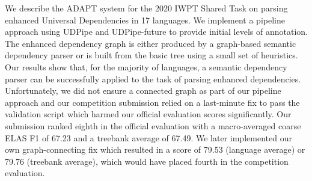 We describe the ADAPT system for the 2020 IWPT Shared Task on parsing enhanced Universal Dependencies in 17 languages. We implement a pipeline approach using UDPipe and UDPipe-future to provide initial levels of annotation. The enhanced dependency graph is either produced by a graph-based semantic dependency parser or is built from the basic tree using a small set of heuristics. Our results show that, for the majority of languages, a semantic dependency parser can be successfully applied to the task of parsing enhanced dependencies. Unfortunately, we did not ensure a connected graph as part of our pipeline approach and our competition submission relied on a last-minute fix to pass the validation script which harmed our official evaluation scores significantly. Our submission ranked eighth in the official evaluation with a macro-averaged coarse ELAS F1 of 67.23 and a treebank average of 67.49. We later implemented our own graph-connecting fix which resulted in a score of 79.53 (language average) or 79.76 (treebank average), which would have placed fourth in the competition evaluation.
